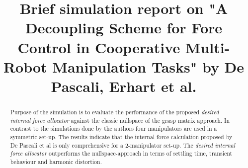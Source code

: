 \documentclass[conference]{IEEEtran}
\begin{document}
%
\title{Brief simulation report on "A Decoupling Scheme for Fore Control in Cooperative Multi-Robot Manipulation Tasks" by De Pascali, Erhart et al.}


\author{

}

\maketitle

\begin{abstract}
Purpose of the simulation is to evaluate the performance of the proposed \textit{desired internal force allocator} against the classic nullspace of the grasp matrix approach. In contrast to the simulations done by the authors four manipulators are used in a symmetric set-up. The results indicate that the internal force calculation proposed by De Pascali et al is only comprehensive for a 2-manipulator set-up. The \textit{desired internal force allocator} outperforms the nullspace-approach in terms of settling time, transient behaviour and harmonic distortion.
\end{abstract}
\end{document}
